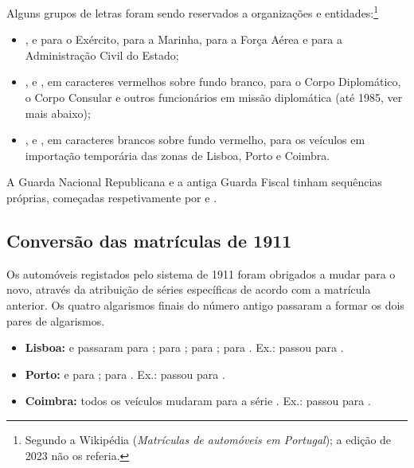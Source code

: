 Alguns grupos de letras foram sendo reservados a organizações e entidades:\footnote{Segundo a Wikipédia (\emph{Matrículas de automóveis em Portugal}); a edição de 2023 não os referia.}
\begin{itemize}
  \item {},  e  para o Exército,  para a
        Marinha,  para a Força Aérea e  para a Administração
        Civil do Estado;
  \item {},  e , em caracteres vermelhos sobre fundo
        branco, para o Corpo Diplomático, o Corpo Consular e outros funcionários
        em missão diplomática (até 1985, ver mais abaixo);
  \item {},  e , em caracteres brancos sobre fundo
        vermelho, para os veículos em importação temporária das zonas de Lisboa,
        Porto e Coimbra.
\end{itemize}
A Guarda Nacional Republicana e a antiga Guarda Fiscal tinham sequências
próprias, começadas respetivamente por  e .

\subsection{Conversão das matrículas de 1911}

Os automóveis registados pelo sistema de 1911 foram obrigados a mudar para o
novo, através da atribuição de séries específicas de acordo com a matrícula
anterior. Os quatro algarismos finais do número antigo passaram a formar os dois
pares de algarismos.

\begin{itemize}
  \item \textbf{Lisboa:}  e  passaram para ;
         para ;  para ;
         para .
        Ex.:  passou para .
  \item \textbf{Porto:}  e  para ;
         para .
        Ex.:  passou para .
  \item \textbf{Coimbra:} todos os veículos mudaram para a série .
        Ex.:  passou para .
\end{itemize}

